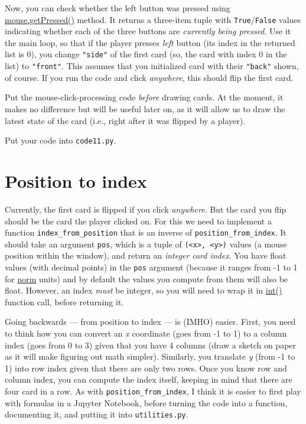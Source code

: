 \documentclass[
]{book}
\begin{document}
Now, you can check whether the left button was pressed using \href{https://psychopy.org/api/event.html\#psychopy.event.Mouse.getPressed}{mouse.getPressed()} method. It returns a three-item tuple with \texttt{True}/\texttt{False} values indicating whether each of the three buttons are \emph{currently being pressed}. Use it the main loop, so that if the player presses \emph{left} button (its index in the returned list is 0), you change \texttt{"side"} of the first card (so, the card with index 0 in the list) to \texttt{"front"}. This assumes that you initialized card with their \texttt{"back"} shown, of course. If you run the code and click \emph{anywhere}, this should flip the first card.

Put the mouse-click-processing code \emph{before} drawing cards. At the moment, it makes no difference but will be useful later on, as it will allow us to draw the latest state of the card (i.e., right after it was flipped by a player).

Put your code into \texttt{code11.py}.

\hypertarget{position-to-index}{%
\section{Position to index}\label{position-to-index}}

Currently, the first card is flipped if you click \emph{anywhere}. But the card you flip should be the card the player clicked on. For this we need to implement a function \texttt{index\_from\_position} that is an inverse of \texttt{position\_from\_index}. It should take an argument \texttt{pos}, which is a tuple of \texttt{(\textless{}x\textgreater{},\ \textless{}y\textgreater{})} values (a mouse position within the window), and return an \emph{integer card index}. You have float values (with decimal points) in the \texttt{pos} argument (because it ranges from -1 to 1 for \protect\hyperlink{psychopy-units-norm}{norm} units) and by default the values you compute from them will also be float. However, an index \emph{must} be integer, so you will need to wrap it in \href{https://docs.python.org/3/library/functions.html\#int}{int()} function call, before returning it.

Going backwards --- from position to index --- is (IMHO) easier. First, you need to think how you can convert an \emph{x} coordinate (goes from -1 to 1) to a column index (goes from 0 to 3) given that you have 4 columns (draw a sketch on paper as it will make figuring out math simpler). Similarly, you translate \emph{y} (from -1 to 1) into row index given that there are only two rows. Once you know row and column index, you can compute the index itself, keeping in mind that there are four card in a row. As with \texttt{position\_from\_index}, I think it is easier to first play with formulas in a Jupyter Notebook, before turning the code into a function, documenting it, and putting it into \texttt{utilities.py}.
\end{document}
